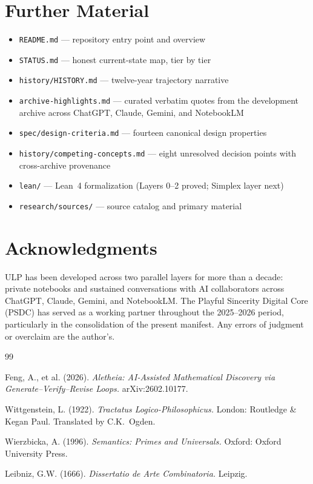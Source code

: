 \documentclass[12pt]{article}
\begin{document}
\section*{Further Material}

\begin{itemize}[leftmargin=*, itemsep=0.2em]
    \item \texttt{README.md} --- repository entry point and overview
    \item \texttt{STATUS.md} --- honest current-state map, tier by tier
    \item \texttt{history/HISTORY.md} --- twelve-year trajectory narrative
    \item \texttt{archive-highlights.md} --- curated verbatim quotes from the development archive across ChatGPT, Claude, Gemini, and NotebookLM
    \item \texttt{spec/design-criteria.md} --- fourteen canonical design properties
    \item \texttt{history/competing-concepts.md} --- eight unresolved decision points with cross-archive provenance
    \item \texttt{lean/} --- Lean~4 formalization (Layers 0--2 proved; Simplex layer next)
    \item \texttt{research/sources/} --- source catalog and primary material
\end{itemize}

\section*{Acknowledgments}

ULP has been developed across two parallel layers for more than a decade: private notebooks and sustained conversations with AI collaborators across ChatGPT, Claude, Gemini, and NotebookLM. The Playful Sincerity Digital Core (PSDC) has served as a working partner throughout the 2025--2026 period, particularly in the consolidation of the present manifest. Any errors of judgment or overclaim are the author's.

\begin{thebibliography}{99}

Feng, A., et al. (2026).
\textit{Aletheia: AI-Assisted Mathematical Discovery via Generate--Verify--Revise Loops.}
arXiv:2602.10177.

Wittgenstein, L. (1922).
\textit{Tractatus Logico-Philosophicus.}
London: Routledge \& Kegan Paul. Translated by C.K.\ Ogden.

Wierzbicka, A. (1996).
\textit{Semantics: Primes and Universals.}
Oxford: Oxford University Press.

Leibniz, G.W. (1666).
\textit{Dissertatio de Arte Combinatoria.}
Leipzig.

\end{thebibliography}
\end{document}
